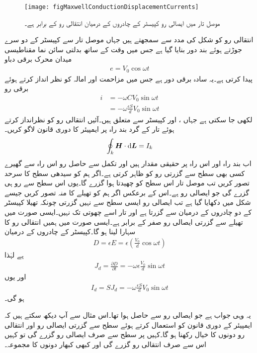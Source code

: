 \begin{figure}
\centering
\texttt{[image: figMaxwellConductionDisplacementCurrents]}
\caption{موصل تار میں ایصالی رو کپیسٹر کے چادروں کے درمیان انتقالی رو کے برابر ہے۔}
\label{شکل_میکس_ویل_ایصالی_انتقالی_رو}
\end{figure}

انتقالی رو کو شکل  کی مدد سے سمجھتے ہیں جہاں موصل تار سے کپیسٹر  کے دو سرے جوڑتے ہوئے بند دور بنایا گیا ہے جس میں وقت کے ساتھ بدلتی سائن نما مقناطیسی میدان  محرک برقی دباو
\begin{align*}
e=V_0 \cos \omega t
\end{align*}
 پیدا کرتی ہے۔یہ سادہ برقی دور ہے جس میں مزاحمت اور امالہ کو نظر انداز کرتے ہوئے برقی رو
\begin{align*}
i&=-\omega C V_0 \sin \omega t\\
&=-\omega \frac{\epsilon S}{d} V_0 \sin \omega t
\end{align*}
لکھی جا سکتی ہے جہاں ،  اور  کپیسٹر سے متعلق ہیں۔آئیں انتقالی رو کو نظرانداز کرتے ہوئے تار کے گرد بند راہ   پر ایمپیئر کا دوری قانون لاگو کریں۔
\begin{align*}
\oint_k \kvec{H} \cdot \dif \kvec{L}=I_k
\end{align*}
اب بند راہ  اور اس راہ پر  حقیقی مقدار ہیں اور تکمل سے حاصل رو  اس راہ سے گھیرے کسی بھی سطح سے گزرتی رو کو ظاہر کرتی ہے۔اگر ہم  کو سیدھی سطح کا سرحد تصور کریں تب موصل تار اس سطح کو چھیدتا ہوا گزرے گا۔یوں اس سطح سے  رو ہی گزرے گی جو ایصالی رو ہے۔اس کے برعکس اگر ہم  کو تھیلے کا منہ تصور کریں جیسے شکل میں دکھایا گیا ہے تب ایصالی رو ایسی سطح سے نہیں گزرتی چونکہ تھیلا کپیسٹر کے دو چادروں کے درمیان سے گزرتا ہے اور تار اسے چھوتی تک نہیں۔ایسی صورت میں تھیلے سے گزرتی ایصالی رو صفر کے برابر ہے۔ایسی صورت میں ہمیں انتقالی رو کا سہارا لینا ہو گا۔کپیسٹر کے چادروں کے درمیان
\begin{align*}
D=\epsilon E=\epsilon \left(\frac{V_0}{d} \cos \omega t \right)
\end{align*}
ہے لہٰذا
\begin{align*}
J_d=\frac{\partial D}{\partial t}=-\omega \epsilon \frac{V_0}{d} \sin \omega t
\end{align*}
اور یوں
\begin{align*}
I_d=S J_d =-\omega \frac{\epsilon  S}{d} V_0\sin \omega t 
\end{align*}
ہو گی۔

یہ وہی جواب ہے جو ایصالی رو سے حاصل ہوا تھا۔اس مثال سے آپ دیکھ سکتے ہیں کہ ایمپیئر کے دوری قانون کو استعمال کرتے ہوئے سطح سے  گزرتی ایصالی رو اور انتقالی رو دونوں کا خیال رکھنا ہو گا۔کہیں پر سطح سے صرف ایصالی رو گزرے گی تو کہیں اس سے صرف انتقالی رو گزرے گی اور کبھی کبھار دونوں کا مجموعہ۔


